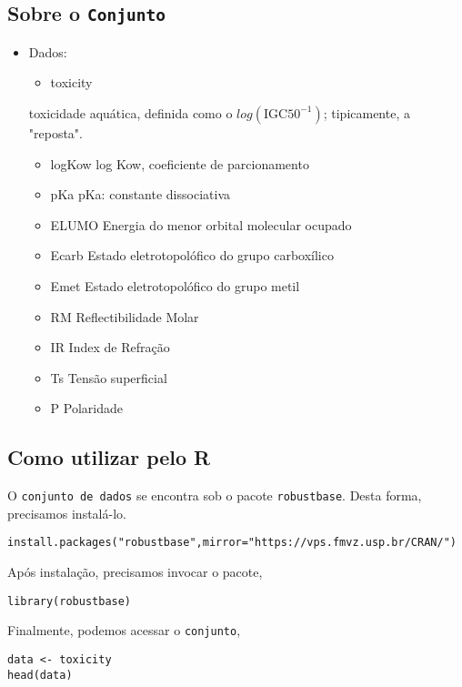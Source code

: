 \documentclass[12pt]{abntex2}
\begin{document}
\subsection{Sobre o \texttt{Conjunto}}
\label{sec:org48b5e0e}
\begin{itemize}
\item Dados:
\begin{itemize}
\item toxicity
\end{itemize}
toxicidade  aquática, definida como o \(log(\textrm{IGC50}^{-1})\); tipicamente, a "reposta".
\begin{itemize}
\item logKow
log Kow, coeficiente de parcionamento
\item pKa
pKa: constante dissociativa
\item ELUMO
Energia do menor orbital molecular ocupado
\item Ecarb
Estado eletrotopolófico do grupo carboxílico
\item Emet
Estado eletrotopolófico do grupo metil
\item RM
Reflectibilidade Molar
\item IR
Index de Refração
\item Ts
Tensão superficial
\item P
Polaridade
\end{itemize}
\end{itemize}
\subsection{Como utilizar pelo R}
\label{sec:orgdd2a536}
O \texttt{conjunto de dados} se encontra sob o pacote \texttt{robustbase}. Desta forma, precisamos
instalá-lo.

\begin{verbatim}
install.packages("robustbase",mirror="https://vps.fmvz.usp.br/CRAN/")
\end{verbatim}

Após instalação, precisamos invocar o pacote,
\begin{verbatim}
library(robustbase)
\end{verbatim}

Finalmente, podemos acessar o \texttt{conjunto},
\begin{verbatim}
data <- toxicity
head(data)
\end{verbatim}
\end{document}

